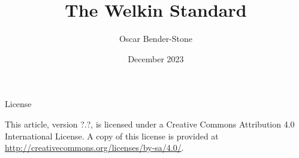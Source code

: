 \documentclass{article}
\title{The Welkin Standard}
\author{Oscar Bender-Stone}
\date{December 2023}
\begin{document}
\maketitle

\begin{center}
{\sc License}\

\vspace{2ex}
This article, version ?.?, is licensed under a Creative Commons Attribution 4.0 International License.
A copy of this license is provided at \url{http://creativecommons.org/licenses/by-sa/4.0/}.
\end{center}



\end{document}
